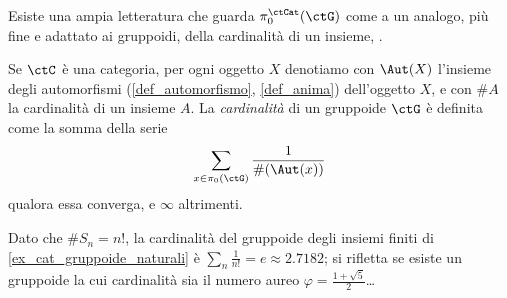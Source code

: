 Esiste una ampia letteratura che guarda \(\pi_0^\ctCat(\ctG)\) come a un analogo, più fine e adattato ai gruppoidi, della cardinalità di un insieme, \cite{a,b,c}.
\begin{definition}
 Se \(\ctC\) è una categoria, per ogni oggetto \(X\) denotiamo con \(\Aut(X)\) l'insieme degli automorfismi (\ref{def_automorfismo}, \ref{def_anima}) dell'oggetto \(X\), e con \(\# A\) la cardinalità di un insieme \(A\). La \emph{cardinalità} di un gruppoide \(\ctG\) è definita come la somma della serie
 \[\sum_{x\in \pi_0(\ctG)} \frac 1{\#(\Aut(x))}\]
 qualora essa converga, e \(\infty\) altrimenti.
\end{definition}
Dato che \(\# S_n = n!\), la cardinalità del gruppoide degli insiemi finiti di \ref{ex_cat_gruppoide_naturali} è \(\sum_n \frac 1{n!} = e \approx 2.7182\); si rifletta se esiste un gruppoide la cui cardinalità sia il numero aureo \(\varphi = \frac{1+\sqrt 5}{2}\)\dots
